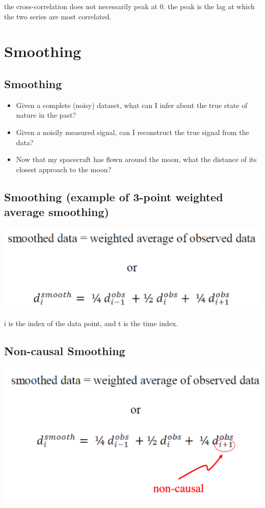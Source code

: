 \documentclass[11pt]{article}
\theoremstyle{definition}
\begin{document}
the cross-correlation does not necessarily peak at 0. the peak is the lag at which the two series are most correlated.

\section{Smoothing}
\subsection{Smoothing}
\begin{itemize}
  \item Given a complete (noisy) dataset, what can I infer about the
  true state of nature in the past?
  \item Given a noisily measured signal, can I reconstruct the true
  signal from the data?
  \item Now that my spacecraft has flown around the moon, what the
  distance of its closest approach to the moon?
\end{itemize}

\subsection{Smoothing
(example of 3-point weighted average smoothing)}
\includegraphics[width = \textwidth]{14.png}

i is the index of the data point, and t is the time index.

\subsection{Non-causal Smoothing}
\includegraphics[width = \textwidth]{15.png}
\end{document}
